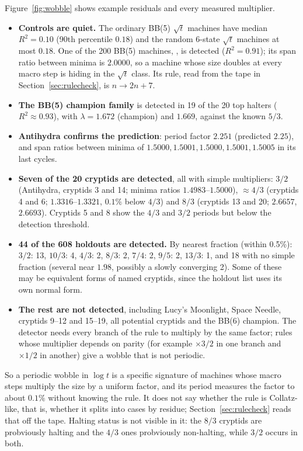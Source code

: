 \documentclass[11pt,a4paper]{article}
\newcommand{\tm}[1]{\texttt{\detokenize{#1}}}   %
\newcommand{\BB}[1]{BB(#1)}
\begin{document}
Figure~\ref{fig:wobble} shows example residuals and every measured multiplier.
\begin{itemize}
\item \textbf{Controls are quiet.} The ordinary \BB{5} $\sqrt t$ machines have median
$R^2 = 0.10$ (90th percentile $0.18$) and the random 6-state $\sqrt t$ machines at most $0.18$.
One of the 200 \BB{5} machines, \tm{1RB0LC_1LC1LE_1RD0LB_0RA1RC_---0RA}, is detected
($R^2 = 0.91$); its span ratio between minima is $2.0000$, so a machine whose size doubles at
every macro step is hiding in the $\sqrt t$ class. Its rule, read from the tape in
Section~\ref{sec:rulecheck}, is $n \to 2n + 7$.
\item \textbf{The \BB{5} champion family} is detected in 19 of the 20 top halters ($R^2\approx0.93$),
with $\lambda = 1.672$ (champion) and $1.669$, against the known $5/3$.
\item \textbf{Antihydra confirms the prediction}: period factor $2.251$ (predicted $2.25$), and span
ratios between minima of $1.5000, 1.5001, 1.5000, 1.5001, 1.5005$ in its last cycles.
\item \textbf{Seven of the 20 cryptids are detected}, all with simple multipliers:
$3/2$ (Antihydra, cryptids 3 and 14; minima ratios $1.4983$--$1.5000$), $\approx4/3$ (cryptids 4 and 6;
$1.3316$--$1.3321$, $0.1\%$ below $4/3$) and $8/3$ (cryptids 13 and 20; $2.6657$, $2.6693$).
Cryptids 5 and 8 show the $4/3$ and $3/2$ periods but below the detection threshold.
\item \textbf{44 of the 608 holdouts are detected.} By nearest fraction (within 0.5\%):
$3/2$: 13, $10/3$: 4, $4/3$: 2, $8/3$: 2, $7/4$: 2, $9/5$: 2, $13/3$: 1, and 18 with no simple fraction
(several near $1.98$, possibly a slowly converging 2). Some of these may be equivalent forms of
named cryptids, since the holdout list uses its own normal form.
\item \textbf{The rest are not detected}, including Lucy's Moonlight, Space Needle, cryptids 9--12
and 15--19, all potential cryptids and the \BB{6} champion. The detector needs every branch of
the rule to multiply by the same factor; rules whose multiplier depends on parity (for example
$\times3/2$ in one branch and $\times1/2$ in another) give a wobble that is not periodic.
\end{itemize}

So a periodic wobble in $\log t$ is a specific signature of machines whose macro steps multiply
the size by a uniform factor, and its period measures the factor to about $0.1\%$ without knowing
the rule. It does not say whether the rule is Collatz-like, that is, whether it splits into cases
by residue; Section~\ref{sec:rulecheck} reads that off the tape.
Halting status is not visible in it: the $8/3$ cryptids are probviously halting and the $4/3$ ones
probviously non-halting, while $3/2$ occurs in both.
\end{document}
